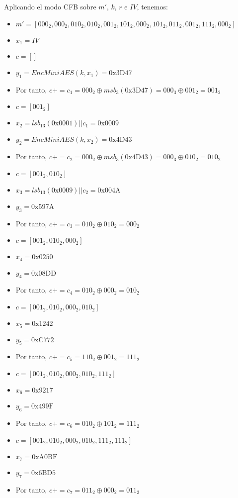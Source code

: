 \begin{enumerate}
		Aplicando el modo CFB sobre $m'$, $k$, $r$ e $IV$, tenemos:
		\begin{itemize}
			\item $m' = [000_2, 000_2, 010_2, 010_2, 001_2, 101_2, 000_2, 101_2, 011_2, 001_2, 111_2, 000_2]$
			\item $x_1 = IV$
			\item $c = []$
			\item $y_1 = EncMiniAES(k, x_1) = \mathrm{0x3D47}$
			\item Por tanto, $c += c_1 = 000_2 \oplus msb_3(\mathrm{0x3D47}) = 000_3 \oplus 001_2 = 001_2$
			\item $c = [001_2]$
			\item $x_2 = lsb_{13}(\mathrm{0x0001}) || c_1 = \mathrm{0x0009}$
			\item $y_2 = EncMiniAES(k, x_2) = \mathrm{0x4D43}$
			\item Por tanto, $c += c_2 = 000_2 \oplus msb_3(\mathrm{0x4D43}) = 000_3 \oplus 010_2 = 010_2$
			\item $c = [001_2, 010_2]$
			\item $x_3 = lsb_{13}(\mathrm{0x0009}) || c_2 = \mathrm{0x004A}$
			\item $y_3 = \mathrm{0x597A}$
			\item Por tanto, $c += c_3 = 010_2 \oplus 010_2 = 000_2$
			\item $c = [001_2, 010_2, 000_2]$
			\item $x_4 = \mathrm{0x0250}$
			\item $y_4 = \mathrm{0x08DD}$
			\item Por tanto, $c += c_4 = 010_2 \oplus 000_2 = 010_2$
			\item $c = [001_2, 010_2, 000_2, 010_2]$
			\item $x_5 = \mathrm{0x1242}$
			\item $y_5 = \mathrm{0xC772}$
			\item Por tanto, $c += c_5 = 110_2 \oplus 001_2 = 111_2$
			\item $c = [001_2, 010_2, 000_2, 010_2, 111_2]$
			\item $x_6 = \mathrm{0x9217}$
			\item $y_6 = \mathrm{0x499F}$
			\item Por tanto, $c += c_6 = 010_2 \oplus 101_2 = 111_2$
			\item $c = [001_2, 010_2, 000_2, 010_2, 111_2, 111_2]$
			\item $x_7 = \mathrm{0xA0BF}$
			\item $y_7 = \mathrm{0x6BD5}$
			\item Por tanto, $c += c_7 = 011_2 \oplus 000_2 = 011_2$

\end{itemize}
\end{enumerate}
